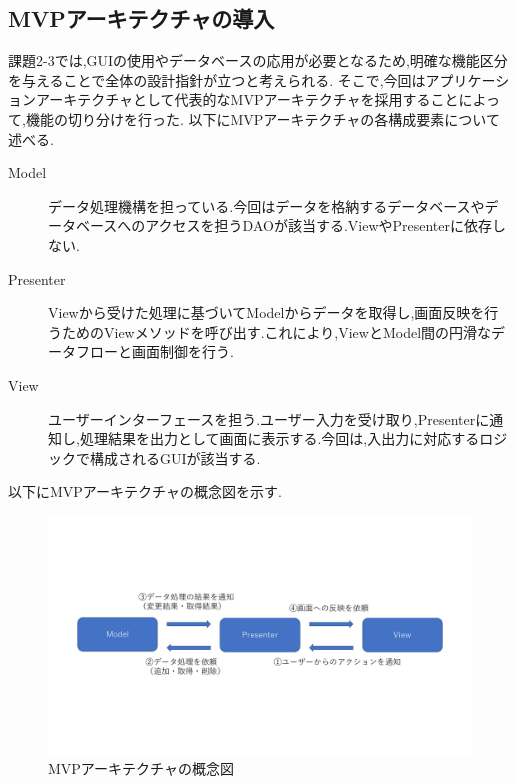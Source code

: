 \documentclass[12pt]{jarticle}
\begin{document}
\subsection{MVPアーキテクチャの導入}
課題2-3では,GUIの使用やデータベースの応用が必要となるため,明確な機能区分を与えることで全体の設計指針が立つと考えられる.
そこで,今回はアプリケーションアーキテクチャとして代表的なMVPアーキテクチャを採用することによって,機能の切り分けを行った.
以下にMVPアーキテクチャの各構成要素について述べる.
\begin{description}
\item[Model] データ処理機構を担っている.今回はデータを格納するデータベースやデータベースへのアクセスを担うDAOが該当する.ViewやPresenterに依存しない.
\item[Presenter] Viewから受けた処理に基づいてModelからデータを取得し,画面反映を行うためのViewメソッドを呼び出す.これにより,ViewとModel間の円滑なデータフローと画面制御を行う.
\item[View] ユーザーインターフェースを担う.ユーザー入力を受け取り,Presenterに通知し,処理結果を出力として画面に表示する.今回は,入出力に対応するロジックで構成されるGUIが該当する.
\end{description}
以下にMVPアーキテクチャの概念図を示す.


\begin{figure}[!hbt]
    \centering
    \includegraphics[scale=0.35]{images/mvp_architecture.pdf}
    \caption{MVPアーキテクチャの概念図}
\end{figure}
\end{document}
